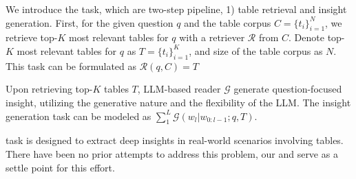 We introduce the \task task, which are two-step pipeline, 1) table retrieval and insight generation.
First, for the given question $q$ and the table corpus $C=\{t_i\}_{i=1}^N$, we retrieve top-$K$ most relevant tables for $q$ with a retriever $\mathcal{R}$ from $C$.
Denote top-$K$ most relevant tables for $q$ as $T=\{t_i\}_{i=1}^K$, and size of the table corpus as $N$.
This task can be formulated as $\mathcal{R}(q,C)=T$

Upon retrieving top-$K$ tables $T$, LLM-based reader $\mathcal{G}$ generate question-focused insight, utilizing the generative nature and the flexibility of the LLM.
The insight generation task can be modeled as $\sum_1^L\mathcal{G}(w_l|w_{0:l-1};q,T)$.

\task task is designed to extract deep insights in real-world scenarios involving tables.
There have been no prior attempts to address this problem, our \bench and \eval serve as a settle point for this effort.